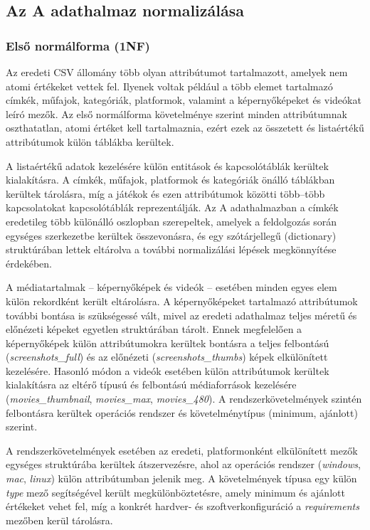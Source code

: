 \subsection{Az A adathalmaz normalizálása}

\subsubsection{Első normálforma (1NF)}

Az eredeti CSV állomány több olyan attribútumot tartalmazott, amelyek nem atomi értékeket vettek fel. Ilyenek voltak például a több elemet tartalmazó címkék, műfajok, kategóriák, platformok, valamint a képernyőképeket és videókat leíró mezők. Az első normálforma követelménye szerint minden attribútumnak oszthatatlan, atomi értéket kell tartalmaznia, ezért ezek az összetett és listaértékű attribútumok külön táblákba kerültek.

A listaértékű adatok kezelésére külön entitások és kapcsolótáblák kerültek kialakításra. A címkék, műfajok, platformok és kategóriák önálló táblákban kerültek tárolásra, míg a játékok és ezen attribútumok közötti több–több kapcsolatokat kapcsolótáblák reprezentálják. Az A adathalmazban a címkék eredetileg több különálló oszlopban szerepeltek, amelyek a feldolgozás során egységes szerkezetbe kerültek összevonásra, és egy szótárjellegű (dictionary) struktúrában lettek eltárolva a további normalizálási lépések megkönnyítése érdekében. 

A médiatartalmak – képernyőképek és videók – esetében minden egyes elem külön rekordként került eltárolásra. A képernyőképeket tartalmazó attribútumok további bontása is szükségessé vált, mivel az eredeti adathalmaz teljes méretű és előnézeti képeket egyetlen struktúrában tárolt. Ennek megfelelően a képernyőképek külön attribútumokra kerültek bontásra a teljes felbontású (\textit{screenshots\_full}) és az előnézeti (\textit{screenshots\_thumbs}) képek elkülönített kezelésére. Hasonló módon a videók esetében külön attribútumok kerültek kialakításra az eltérő típusú és felbontású médiaforrások kezelésére (\textit{movies\_thumbnail}, \textit{movies\_max}, \textit{movies\_480}). A rendszerkövetelmények szintén felbontásra kerültek operációs rendszer és követelménytípus (minimum, ajánlott) szerint. 

A rendszerkövetelmények esetében az eredeti, platformonként elkülönített mezők egységes struktúrába kerültek átszervezésre, ahol az operációs rendszer (\textit{windows}, \textit{mac}, \textit{linux}) külön attribútumban jelenik meg. A követelmények típusa egy külön \textit{type} mező segítségével került megkülönböztetésre, amely minimum és ajánlott értékeket vehet fel, míg a konkrét hardver- és szoftverkonfiguráció a \textit{requirements} mezőben kerül tárolásra.


